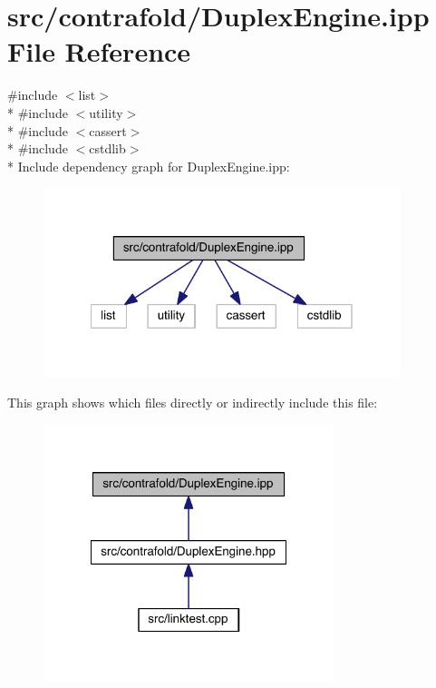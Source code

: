 \hypertarget{_duplex_engine_8ipp}{\section{src/contrafold/\+Duplex\+Engine.ipp File Reference}
\label{_duplex_engine_8ipp}
}
{\ttfamily \#include $<$list$>$}\\*
{\ttfamily \#include $<$utility$>$}\\*
{\ttfamily \#include $<$cassert$>$}\\*
{\ttfamily \#include $<$cstdlib$>$}\\*
Include dependency graph for Duplex\+Engine.\+ipp\+:
\nopagebreak
\begin{figure}[H]
\begin{center}
\leavevmode
\includegraphics[width=295pt]{_duplex_engine_8ipp__incl}
\end{center}
\end{figure}
This graph shows which files directly or indirectly include this file\+:
\nopagebreak
\begin{figure}[H]
\begin{center}
\leavevmode
\includegraphics[width=240pt]{_duplex_engine_8ipp__dep__incl}
\end{center}
\end{figure}
